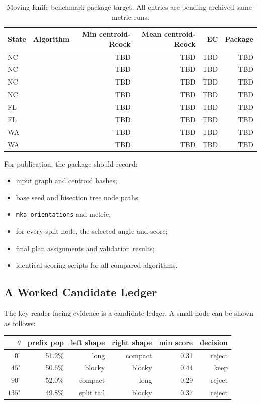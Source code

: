 \begin{table}[h]
\centering
\caption{Moving-Knife benchmark package target. All entries are pending
archived same-metric runs.}
\label{tab:reock-comparison}
\renewcommand{\arraystretch}{1.25}
\begin{tabular}{@{}llrrrr@{}}
\toprule
State & Algorithm & Min centroid-Reock & Mean centroid-Reock & EC & Package \\
\midrule
NC & \metis{} & TBD & TBD & TBD & TBD \\
NC & \cvdgeo{} & TBD & TBD & TBD & TBD \\
NC & \bfsg{} & TBD & TBD & TBD & TBD \\
NC & \mka{} & TBD & TBD & TBD & TBD \\
FL & \metis{} & TBD & TBD & TBD & TBD \\
FL & \mka{} & TBD & TBD & TBD & TBD \\
WA & \metis{} & TBD & TBD & TBD & TBD \\
WA & \mka{} & TBD & TBD & TBD & TBD \\
\bottomrule
\end{tabular}
\end{table}

For publication, the package should record:
\begin{itemize}
\item input graph and centroid hashes;
\item base seed and bisection tree node paths;
\item \texttt{mka\_orientations} and metric;
\item for every split node, the selected angle and score;
\item final plan assignments and validation results;
\item identical scoring scripts for all compared algorithms.
\end{itemize}

\subsection{A Worked Candidate Ledger}

The key reader-facing evidence is a candidate ledger. A small node can be
shown as follows:

\begin{center}
\begin{tabular}{rrrrrr}
\toprule
$\theta$ & prefix pop & left shape & right shape & min score & decision \\
\midrule
$0^\circ$ & 51.2\% & long & compact & 0.31 & reject \\
$45^\circ$ & 50.6\% & blocky & blocky & 0.44 & keep \\
$90^\circ$ & 52.0\% & compact & long & 0.29 & reject \\
$135^\circ$ & 49.8\% & split tail & blocky & 0.37 & reject \\
\bottomrule
\end{tabular}
\end{center}

